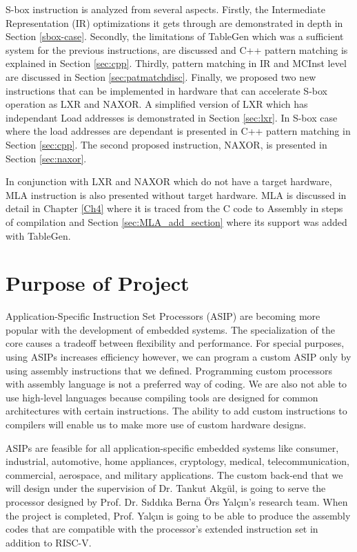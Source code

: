 S-box instruction is analyzed from several aspects. Firstly, the Intermediate Representation (IR) optimizations it gets through are demonstrated in depth in Section \ref{sbox-case}. Secondly, the limitations of TableGen which was a sufficient system for the previous instructions, are discussed and C++ pattern matching is explained in Section \ref{sec:cpp}. 
Thirdly, pattern matching in IR and MCInst level are discussed in Section \ref{sec:patmatchdisc}. Finally, we proposed two new instructions that can be implemented in hardware that can accelerate S-box operation as LXR and NAXOR. A simplified version of LXR which has independant Load addresses is demonstrated in Section \ref{sec:lxr}. In S-box case where the load addresses are dependant is presented in C++ pattern matching in Section \ref{sec:cpp}. The second proposed instruction, NAXOR, is presented in Section \ref{sec:naxor}.

In conjunction with LXR and NAXOR which do not have a target hardware, MLA instruction is also presented without target hardware. MLA is discussed in detail in Chapter \ref{Ch4} where it is traced from the C code to Assembly in steps of compilation and Section \ref{sec:MLA_add_section} where its support was added with TableGen. 


\section{Purpose of Project}
Application-Specific Instruction Set Processors (ASIP) are becoming more popular with the development of embedded systems. The specialization of the core causes a tradeoff between flexibility and performance. For special purposes, using ASIPs increases efficiency however, we can program a custom ASIP only by using assembly instructions that we defined. Programming custom processors with assembly language is not a preferred way of coding. We are also not able to use high-level languages because compiling tools are designed for common architectures with certain instructions. The ability to add custom instructions to compilers will enable us to make more use of custom hardware designs.

ASIPs are feasible for all application-specific embedded systems like consumer, industrial, automotive, home appliances, cryptology, medical, telecommunication, commercial, aerospace, and military applications. The custom back-end that we will design under the supervision of Dr. Tankut Akgül, is going to serve the processor designed by Prof. Dr. Sıddıka Berna Örs Yalçın’s research team. When the project is completed, Prof. Yalçın is going to be able to produce the assembly codes that are compatible with the processor’s extended instruction set in addition to RISC-V.

